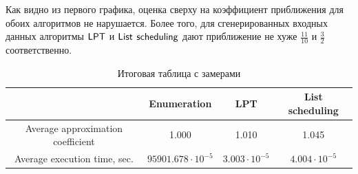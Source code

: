 Как видно из первого графика, оценка сверху на коэффициент приближения для обоих алгоритмов не нарушается. Более того, для сгенерированных входных данных алгоритмы $\sf{LPT}$ и $\sf{List}$ $\sf{scheduling}$ дают приближение не хуже $\frac{11}{10}$ и $\frac{3}{2}$ соответственно.

\begin{table}[h!]
\centering
 \caption{Итоговая таблица с замерами}
 \begin{tabular}{||c c c c||} 
 \hline
  & Enumeration & LPT & List scheduling \\ [0.5ex] 
 \hline\hline
 Average approximation coefficient & 1.000 & 1.010 & 1.045 \\ 
 Average execution time, sec. & $95901.678 \cdot 10^{-5}$ & $3.003 \cdot 10^{-5}$ & $4.004 \cdot 10^{-5}$ \\ [1ex]
 \hline
 \end{tabular}
\end{table}
